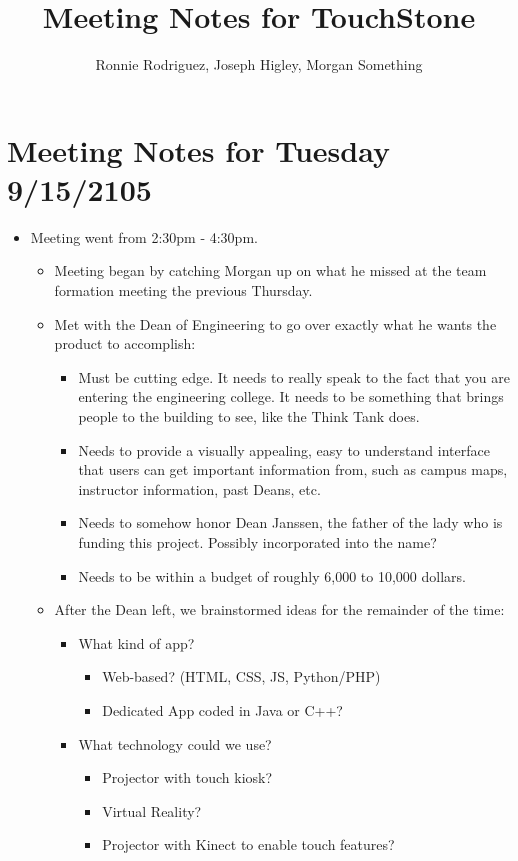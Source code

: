 \documentclass[]{article}
\title{Meeting Notes for TouchStone}
\author{Ronnie Rodriguez, Joseph Higley, Morgan Something}
\begin{document}
\maketitle

\section{Meeting Notes for Tuesday 9/15/2105}
	\begin{itemize}
	\item Meeting went from 2:30pm - 4:30pm.
	\begin{itemize}
		\item Meeting began by catching Morgan up on what he missed at the team formation meeting the previous Thursday.
		\item Met with the Dean of Engineering to go over exactly what he wants the product to accomplish:
			\begin{itemize}
				\item Must be cutting edge. It needs to really speak to the fact that you are entering the engineering college. It needs to be something that brings people to the building to see, like the Think Tank does.
				\item  Needs to provide a visually appealing, easy to understand interface that users can get important information from, such as campus maps, instructor information, past Deans, etc.
				\item Needs to somehow honor Dean Janssen, the father of the lady who is funding this project. Possibly incorporated into the name?
				\item Needs to be within a budget of roughly 6,000 to 10,000 dollars.
			\end{itemize}
		\item After the Dean left, we brainstormed ideas for the remainder of the time:
			\begin{itemize}
				\item What kind of app?
					\begin{itemize}
						\item Web-based? (HTML, CSS, JS, Python/PHP)
						\item Dedicated App coded in Java or C++?
					\end{itemize}
				\item What technology could we use?
					\begin{itemize}
						\item Projector with touch kiosk?
						\item Virtual Reality?
						\item Projector with Kinect to enable touch features?
					\end{itemize}
			\end{itemize}		
	\end{itemize}
	\end{itemize}
\end{document}
